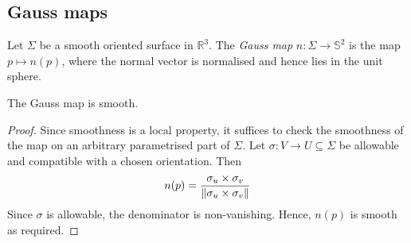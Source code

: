 \subsection{Gauss maps}
\begin{definition}
	Let \( \Sigma \) be a smooth oriented surface in \( \mathbb R^3 \).
	The \textit{Gauss map} \( n \colon \Sigma \to \mathbb S^2 \) is the map \( p \mapsto n(p) \), where the normal vector is normalised and hence lies in the unit sphere.
\end{definition}
\begin{lemma}
	The Gauss map is smooth.
\end{lemma}
\begin{proof}
	Since smoothness is a local property, it suffices to check the smoothness of the map on an arbitrary parametrised part of \( \Sigma \).
	Let \( \sigma \colon V \to U \subseteq \Sigma \) be allowable and compatible with a chosen orientation.
	Then
	\[
		n(p) = \frac{\sigma_u \times \sigma_v}{\norm{\sigma_u \times \sigma_v}}
	\]
	Since \( \sigma \) is allowable, the denominator is non-vanishing.
	Hence, \( n(p) \) is smooth as required.
\end{proof}
